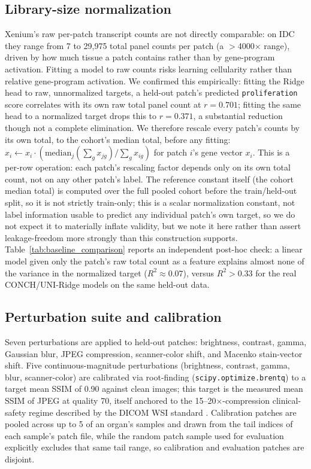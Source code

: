 \documentclass[11pt]{article}
\begin{document}
\subsection{Library-size normalization}
Xenium's raw per-patch transcript counts are not directly comparable: on IDC they range from 7 to 29{,}975 total panel counts per patch (a $>$4000$\times$ range), driven by how much tissue a patch contains rather than by gene-program activation. Fitting a model to raw counts risks learning cellularity rather than relative gene-program activation. We confirmed this empirically: fitting the Ridge head to raw, unnormalized targets, a held-out patch's predicted \texttt{proliferation} score correlates with its own raw total panel count at $r=0.701$; fitting the same head to a normalized target drops this to $r=0.371$, a substantial reduction though not a complete elimination. We therefore rescale every patch's counts by its own total, to the cohort's median total, before any fitting: $x_i \leftarrow x_i \cdot (\text{median}_j(\sum_g x_{jg}) / \sum_g x_{ig})$ for patch $i$'s gene vector $x_i$. This is a per-row operation: each patch's rescaling factor depends only on its own total count, not on any other patch's label. The reference constant itself (the cohort median total) is computed over the full pooled cohort before the train/held-out split, so it is not strictly train-only; this is a scalar normalization constant, not label information usable to predict any individual patch's own target, so we do not expect it to materially inflate validity, but we note it here rather than assert leakage-freedom more strongly than this construction supports. Table~\ref{tab:baseline_comparison} reports an independent post-hoc check: a linear model given only the patch's raw total count as a feature explains almost none of the variance in the normalized target ($R^2\approx0.07$), versus $R^2>0.33$ for the real CONCH/UNI-Ridge models on the same held-out data.

\subsection{Perturbation suite and calibration}
Seven perturbations are applied to held-out patches: brightness, contrast, gamma, Gaussian blur, JPEG compression, scanner-color shift, and Macenko \citep{macenko_2009} stain-vector shift. Five continuous-magnitude perturbations (brightness, contrast, gamma, blur, scanner-color) are calibrated via root-finding (\texttt{scipy.optimize.brentq}) to a target mean SSIM \citep{ssim_2004} of 0.90 against clean images; this target is the measured mean SSIM of JPEG at quality 70, itself anchored to the 15--20$\times$-compression clinical-safety regime described by the DICOM WSI standard \citep{dicom_wsi_standard}. Calibration patches are pooled across up to 5 of an organ's samples and drawn from the tail indices of each sample's patch file, while the random patch sample used for evaluation explicitly excludes that same tail range, so calibration and evaluation patches are disjoint.
\end{document}
